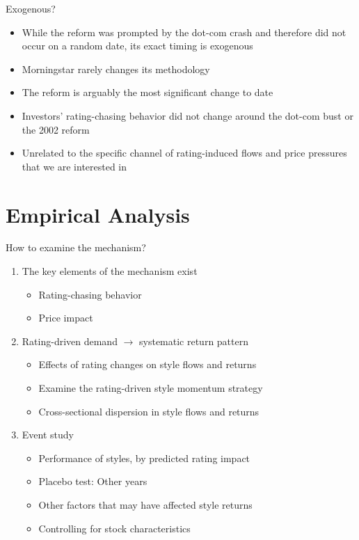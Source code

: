 \documentclass[UTF8, 16pt]{beamer}
\begin{document}
\begin{CJK*}{UTF8}{gbsn}
\begin{frame}{Exogenous?}
	\begin{itemize}
		\item While the reform was prompted by the dot-com crash and therefore did \alert{not} occur on a random date, its \alert{exact timing} is exogenous
		\item Morningstar \alert{rarely changes} its methodology
		\item The reform is arguably \alert{the most significant change to date}
		\item Investors’ \alert{rating-chasing behavior did not change} around the dot-com bust or the 2002 reform
		\item \alert{Unrelated} to the specific channel of rating-induced flows and price pressures that we are interested in
	\end{itemize}
\end{frame}


\section{Empirical Analysis}

\begin{frame}{How to examine the mechanism?}
	\begin{enumerate}
		\item The key elements of the mechanism exist
		\begin{itemize}
			\item Rating-chasing behavior
			\item Price impact
		\end{itemize}
		\item Rating-driven demand $\rightarrow$ systematic return pattern
		\begin{itemize}
			\item Effects of rating changes on style flows and returns
			\item Examine the rating-driven style momentum strategy
			\item Cross-sectional dispersion in style flows and returns
		\end{itemize}
		\item Event study
		\begin{itemize}
			\item Performance of styles, by predicted rating impact
			\item Placebo test: Other years
			\item Other factors that may have affected style returns
			\item Controlling for stock characteristics
		\end{itemize} 
	\end{enumerate}
\end{frame}


\end{CJK*}
\end{document}

